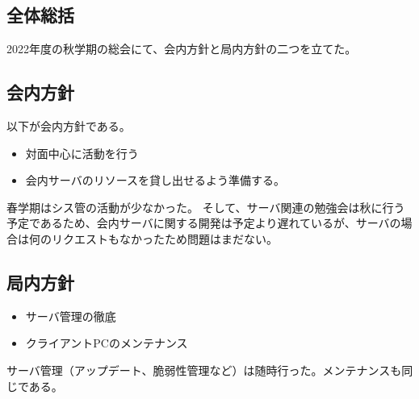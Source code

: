 \subsection*{全体総括}


2022年度の秋学期の総会にて、会内方針と局内方針の二つを立てた。

\subsection{会内方針}
以下が会内方針である。
    \begin{itemize}
        \item 対面中心に活動を行う
        \item 会内サーバのリソースを貸し出せるよう準備する。
    \end{itemize}
春学期はシス管の活動が少なかった。
そして、サーバ関連の勉強会は秋に行う予定であるため、会内サーバに関する開発は予定より遅れているが、サーバの場合は何のリクエストもなかったため問題はまだない。

\subsection{局内方針}
    \begin{itemize}
        \item サーバ管理の徹底
        \item クライアントPCのメンテナンス
    \end{itemize}
サーバ管理（アップデート、脆弱性管理など）は随時行った。メンテナンスも同じである。